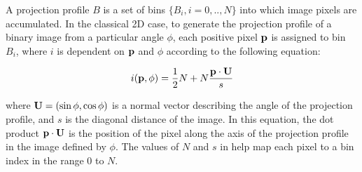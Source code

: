 
A projection profile $B$ is a set of bins $\{B_i, i=0,..,N\}$ into which image
pixels are accumulated.  In the classical 2D case, to generate the projection
profile of a binary image from a particular angle $\phi$, each positive pixel
${ \bf p }$ is assigned to bin $B_i$, where $i$ is dependent on ${ \bf p }$ and
$\phi$ according to the following equation:

\begin{equation} \label{classicproj} 
i({ \bf p },\phi) = \frac{1}{2} N + N
\frac{ { \bf p } \cdot { \bf U } }{ s } 
\end{equation}

{ \parindent 0mm where ${ \bf U }=(\sin \phi,\cos \phi)$ is a normal vector
describing the angle of the projection profile, and $s$ is the diagonal
distance of the image.  In this equation, the dot product ${ \bf p } \cdot
{ \bf U }$ is the position of the pixel along the axis of the projection profile
in the image defined by $\phi$. The values of $N$ and $s$ in
 help map each pixel to a bin index in the range $0$ to $N$.
}



